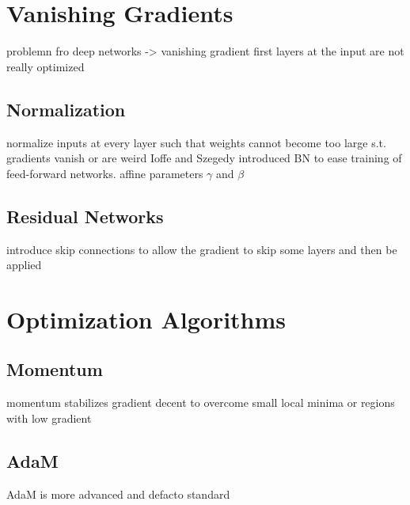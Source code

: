 
\section{Vanishing Gradients}
problemn fro deep networks -> vanishing gradient
first layers at the input are not really optimized
\subsection{Normalization}
normalize inputs at every layer such that weights cannot become too large s.t. gradients vanish or are weird
Ioffe and Szegedy introduced BN to ease training of feed-forward networks.
affine parameters $\gamma$ and $\beta$
\subsection{Residual Networks}
introduce skip connections to allow the gradient to skip some layers and then be applied


\section{Optimization Algorithms}
\subsection{Momentum}
momentum stabilizes gradient decent to overcome small local minima or regions with low gradient
\subsection{AdaM}
AdaM is more advanced and defacto standard

